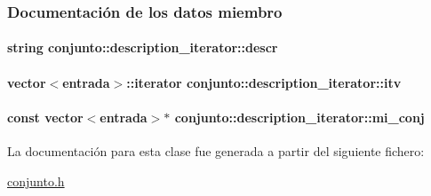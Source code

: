 \subsubsection{Documentación de los datos miembro}
\hypertarget{classconjunto_1_1description__iterator_a3af23f14ec44378308e577ba8c9c71e0}{
\paragraph[{descr}]{\setlength{\rightskip}{0pt plus 5cm}string conjunto\-::description\-\_\-iterator\-::descr\hspace{0.3cm}{\ttfamily [private]}}}\label{classconjunto_1_1description__iterator_a3af23f14ec44378308e577ba8c9c71e0}
\hypertarget{classconjunto_1_1description__iterator_ac4c653cecb7c8076a40338775b2b911b}{
\paragraph[{itv}]{\setlength{\rightskip}{0pt plus 5cm}vector$<${\bf entrada}$>$\-::{\bf iterator} conjunto\-::description\-\_\-iterator\-::itv\hspace{0.3cm}{\ttfamily [private]}}}\label{classconjunto_1_1description__iterator_ac4c653cecb7c8076a40338775b2b911b}
\hypertarget{classconjunto_1_1description__iterator_a0bb45955205380b163640be067af2cd1}{
\paragraph[{mi\-\_\-conj}]{\setlength{\rightskip}{0pt plus 5cm}const vector$<${\bf entrada}$>$$\ast$ conjunto\-::description\-\_\-iterator\-::mi\-\_\-conj\hspace{0.3cm}{\ttfamily [private]}}}\label{classconjunto_1_1description__iterator_a0bb45955205380b163640be067af2cd1}


La documentación para esta clase fue generada a partir del siguiente fichero\-:\begin{DoxyCompactItemize}
\item 
\hyperlink{conjunto_8h}{conjunto.\-h}\end{DoxyCompactItemize}
